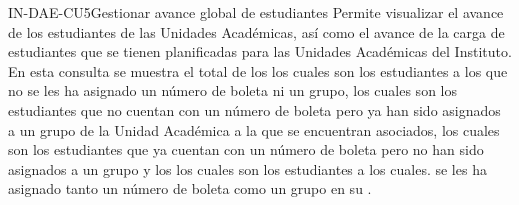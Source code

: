 \begin{UseCase}{IN-DAE-CU5}{Gestionar avance global de estudiantes}{
	Permite visualizar el avance de los estudiantes de las Unidades Académicas, así como el avance de la carga de estudiantes que se tienen planificadas para las Unidades Académicas del Instituto. \\
	
	En esta consulta se muestra el total de los  los cuales son los estudiantes a los que no se les ha asignado un número de boleta ni un grupo,  los cuales son los estudiantes que no cuentan con un número de boleta pero ya han sido asignados a un grupo de la Unidad Académica a la que se encuentran asociados,  los cuales son los estudiantes que ya cuentan con un número de boleta pero no han sido asignados a un grupo y los  los cuales son los estudiantes a los cuales. se les ha asignado tanto un número de boleta como un grupo en su .	
}
\end{UseCase}
